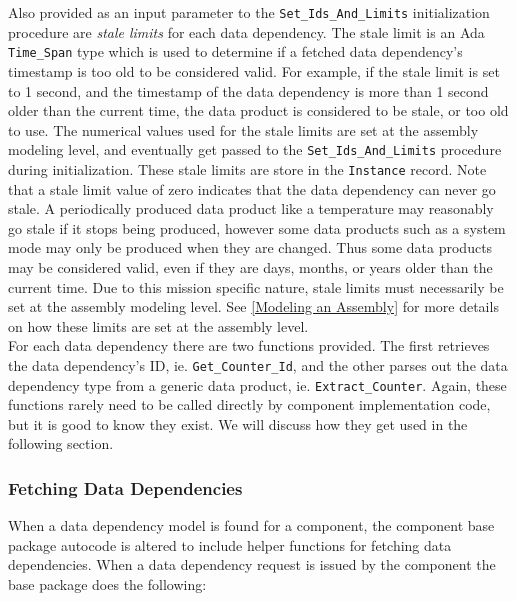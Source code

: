 Also provided as an input parameter to the \texttt{Set\_Ids\_And\_Limits} initialization procedure are \textit{stale limits} for each data dependency. The stale limit is an Ada \texttt{Time\_Span} type which is used to determine if a fetched data dependency's timestamp is too old to be considered valid. For example, if the stale limit is set to 1 second, and the timestamp of the data dependency is more than 1 second older than the current time, the data product is considered to be stale, or too old to use. The numerical values used for the stale limits are set at the assembly modeling level, and eventually get passed to the \texttt{Set\_Ids\_And\_Limits} procedure during initialization. These stale limits are store in the \texttt{Instance} record. Note that a stale limit value of zero indicates that the data dependency can never go stale. A periodically produced data product like a temperature may reasonably go stale if it stops being produced, however some data products such as a system mode may only be produced when they are changed. Thus some data products may be considered valid, even if they are days, months, or years older than the current time. Due to this mission specific nature, stale limits must necessarily be set at the assembly modeling level. See \ref{Modeling an Assembly} for more details on how these limits are set at the assembly level. \\

For each data dependency there are two functions provided. The first retrieves the data dependency's ID, ie. \texttt{Get\_Counter\_Id}, and the other parses out the data dependency type from a generic data product, ie. \texttt{Extract\_Counter}. Again, these functions rarely need to be called directly by component implementation code, but it is good to know they exist. We will discuss how they get used in the following section.

\subsubsection{Fetching Data Dependencies}

When a data dependency model is found for a component, the component base package autocode is altered to include helper functions for fetching data dependencies. When a data dependency request is issued by the component the base package does the following:

